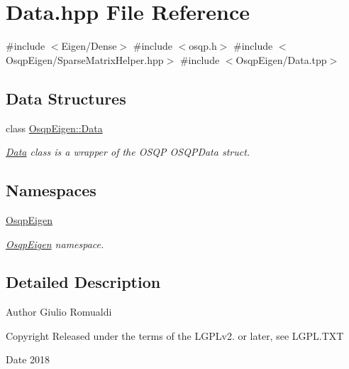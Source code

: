 \section{Data.\+hpp File Reference}
\label{Data_8hpp}
{\ttfamily \#include $<$Eigen/\+Dense$>$}\newline
{\ttfamily \#include $<$osqp.\+h$>$}\newline
{\ttfamily \#include $<$Osqp\+Eigen/\+Sparse\+Matrix\+Helper.\+hpp$>$}\newline
{\ttfamily \#include $<$Osqp\+Eigen/\+Data.\+tpp$>$}\newline
\subsection*{Data Structures}
\begin{DoxyCompactItemize}
\item 
class \mbox{\hyperlink{classOsqpEigen_1_1Data}{Osqp\+Eigen\+::\+Data}}
\begin{DoxyCompactList}\small\item\em \mbox{\hyperlink{classOsqpEigen_1_1Data}{Data}} class is a wrapper of the O\+S\+QP O\+S\+Q\+P\+Data struct. \end{DoxyCompactList}\end{DoxyCompactItemize}
\subsection*{Namespaces}
\begin{DoxyCompactItemize}
\item 
 \mbox{\hyperlink{namespaceOsqpEigen}{Osqp\+Eigen}}
\begin{DoxyCompactList}\small\item\em \mbox{\hyperlink{namespaceOsqpEigen}{Osqp\+Eigen}} namespace. \end{DoxyCompactList}\end{DoxyCompactItemize}


\subsection{Detailed Description}
\begin{DoxyAuthor}{Author}
Giulio Romualdi 
\end{DoxyAuthor}
\begin{DoxyCopyright}{Copyright}
Released under the terms of the L\+G\+P\+Lv2. or later, see L\+G\+P\+L.\+T\+XT 
\end{DoxyCopyright}
\begin{DoxyDate}{Date}
2018 
\end{DoxyDate}
